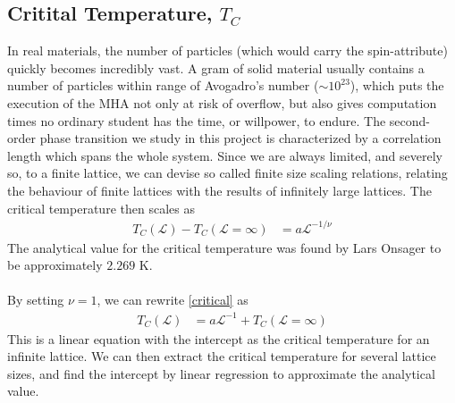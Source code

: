 \subsection{Critital Temperature, $T_C$}\label{sectioncritical}
In real materials, the number of particles (which would carry the spin-attribute) quickly becomes incredibly vast. A gram of solid material usually contains a number of particles within range of Avogadro's number ($\sim 10^{23}$), which puts the execution of the MHA not only at risk of overflow, but also gives computation times no ordinary student has the time, or willpower, to endure. The second-order phase transition we study in this project is characterized by a correlation length which spans the whole system. Since we are always limited, and severely so, to a finite lattice, we can devise so called finite size scaling relations, relating the behaviour of finite lattices with the results of infinitely large lattices. The critical temperature then scales as
\begin{align}
    T_C(\mathcal{L}) - T_C(\mathcal{L} = \infty) &= a\mathcal{L}^{-1/\nu}\label{critical}
\end{align}
The analytical value for the critical temperature was found by Lars Onsager \cite{statphys} to be approximately $2.269$ K.\\ \\
By setting $\nu = 1$, we can rewrite \eqref{critical} as
\begin{align}
    T_C(\mathcal{L}) &= a\mathcal{L}^{-1} + T_C(\mathcal{L}=\infty)\label{critical2}
\end{align}
This is a linear equation with the intercept as the critical temperature for an infinite lattice. We can then extract the critical temperature for several lattice sizes, and find the intercept by linear regression to approximate the analytical value.
